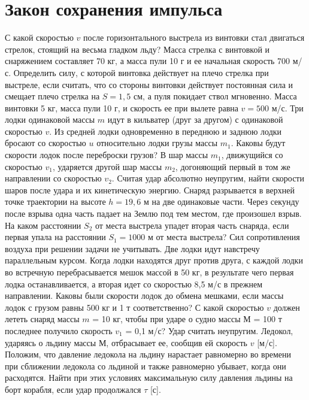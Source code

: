 \section{Закон сохранения импульса}
\AddProb С какой скоростью $v$ после горизонтального выстрела из винтовки стал двигаться стрелок, стоящий на весьма гладком льду? Масса стрелка с винтовкой и снаряжением составляет 70 кг, а масса пули 10 г и ее начальная скорость 700 м/с.
\AddProb Определить силу, с которой винтовка действует на плечо
стрелка при выстреле, если считать, что со стороны винтовки действует постоянная сила и смещает плечо стрелка на $S = 1,5$ см, а пуля покидает ствол мгновенно. Масса винтовки 5 кг, масса пули 10 г, и скорость ее при вылете равна $v = 500$ м/с.
\AddProb Три лодки одинаковой массы $m$ идут в кильватер (друг за
другом) с одинаковой скоростью $v$. Из средней лодки одновременно
в переднюю и заднюю лодки бросают со скоростью $u$ относительно
лодки грузы массы $m_1$. Каковы будут скорости лодок после переброски грузов?
\AddProb В шар массы $m_1$, движущийся со скоростью $v_1$, ударяется
другой шар массы $m_2$, догоняющий первый в том же направлении со
скоростью $v_2$. Считая удар абсолютно неупругим, найти скорости шаров после удара и их кинетическую энергию.
\AddProb Снаряд разрывается в верхней точке траектории на высоте $h = 19,6$ м на две одинаковые части. Через секунду после взрыва одна
часть падает на Землю под тем местом, где произошел взрыв. На
каком расстоянии $S_2$ от места выстрела упадет вторая часть снаряда, если первая упала на расстоянии $S_1 = 1000$ м от места выстрела? Сил сопротивления воздуха при решении задачи не учитывать.
\AddProb Две лодки идут навстречу параллельным курсом. Когда лодки
находятся друг против друга, с каждой лодки во встречную перебрасывается мешок массой в 50 кг, в результате чего первая лодка 
останавливается, а вторая идет со скоростью 8,5 м/с в прежнем направлении. Каковы были скорости лодок до обмена мешками, если массы лодок с грузом равны 500 кг и 1 т соответственно?
\AddProb С какой скоростью $v$ должен лететь снаряд массы $m$ = 10 кг, чтобы при ударе о судно массы $М$ = 100 т последнее получило скорость $v_1$ = 0,1 м/с? Удар считать неупругим.
\AddProb Ледокол, ударяясь о льдину массы $М$, отбрасывает ее, сообщив ей скорость $v$ [м/с]. Положим, что давление ледокола на льдину нарастает равномерно во времени при сближении ледокола со льдиной и также равномерно убывает, когда они расходятся. Найти при этих условиях максимальную силу давления льдины на борт корабля, если удар продолжался $\tau$ [с].
